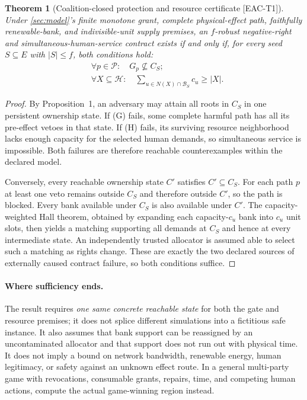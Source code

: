 \documentclass[11pt,a4paper]{article}
\newtheorem{theorem}{Theorem}
\theoremstyle{definition}\newtheorem{definition}{Definition}
\newcommand{\Paths}{\mathcal P}
\newcommand{\Banks}{\mathcal B}
\newcommand{\Humans}{\mathcal H}
\newcommand{\idtag}[1]{\textnormal{\textsf{[#1]}}}
\begin{document}
\begin{theorem}[Coalition-closed protection and resource certificate \idtag{EAC-T1}]
\label{thm:certificate}
Under \cref{sec:model}'s finite monotone grant, complete physical-effect path, faithfully renewable-bank, and indivisible-unit supply premises, an $f$-robust negative-right and simultaneous-human-service contract exists if and only if, for every seed $S\subseteq E$ with $|S|\le f$, both conditions hold:
\begin{align}
&\forall p\in\Paths:\quad G_p\not\subseteq C_S;\tag{G}\label{eq:guards}\\
&\forall X\subseteq\Humans:\quad
\sum_{u\in N(X)\cap\Banks_S}c_u\ge|X|.\tag{H}\label{eq:hall}
\end{align}
\end{theorem}
\begin{proof}
By Proposition~1, an adversary may attain all roots in $C_S$ in one persistent ownership state. If (G) fails, some complete harmful path has all its pre-effect vetoes in that state. If (H) fails, its surviving resource neighborhood lacks enough capacity for the selected human demands, so simultaneous service is impossible. Both failures are therefore reachable counterexamples within the declared model.

Conversely, every reachable ownership state $C'$ satisfies $C'\subseteq C_S$. For each path $p$ at least one veto remains outside $C_S$ and therefore outside $C'$, so the path is blocked. Every bank available under $C_S$ is also available under $C'$. The capacity-weighted Hall theorem, obtained by expanding each capacity-$c_u$ bank into $c_u$ unit slots, then yields a matching supporting all demands at $C_S$ and hence at every intermediate state. An independently trusted allocator is assumed able to select such a matching as rights change. These are exactly the two declared sources of externally caused contract failure, so both conditions suffice.
\end{proof}

\paragraph{Where sufficiency ends.}
The result requires \emph{one same concrete reachable state} for both the gate and resource premises; it does not splice different simulations into a fictitious safe instance. It also assumes that bank support can be reassigned by an uncontaminated allocator and that support does not run out with physical time. It does not imply a bound on network bandwidth, renewable energy, human legitimacy, or safety against an unknown effect route. In a general multi-party game with revocations, consumable grants, repairs, time, and competing human actions, compute the actual game-winning region instead.
\end{document}
